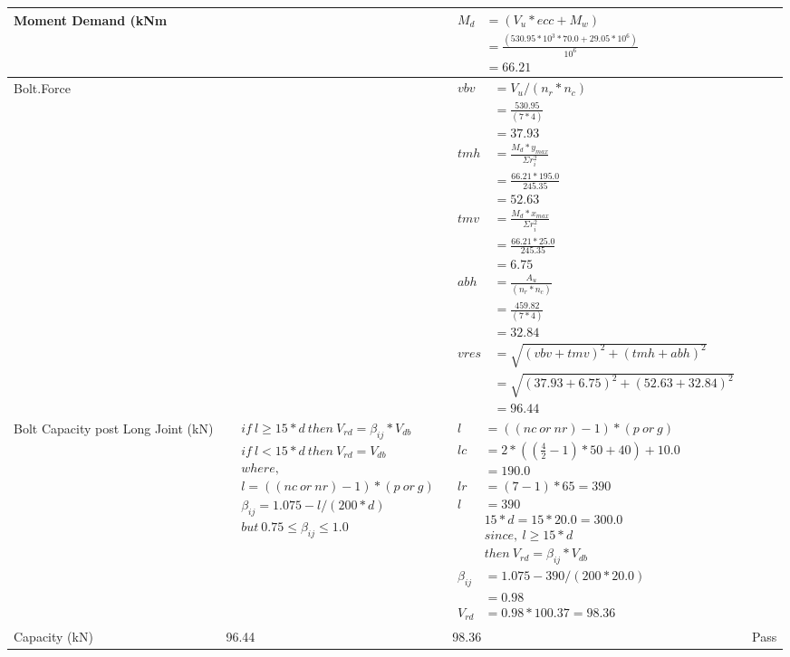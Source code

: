 \documentclass{article}%
\begin{document}
\begin{longtable}{|p{4cm}|p{5cm}|p{5.5cm}|p{1.5cm}|}
\hline%
Moment Demand (kNm&&$\begin{aligned}  M_d &= (V_u * ecc + M_w)\\  &= \frac{(530.95 * 10^3 *70.0 + 29.05*10^6)}{10^6}\\  & =66.21\end{aligned}$&\\%
\hline%
Bolt.Force&&$\begin{aligned} vbv~~ &= V_u / (n_r * n_c)\\  &= \frac{530.95}{ (7*4)}\\  & =37.93\\ tmh~ &= \frac{M_d * y_{max} }{ \Sigma r_i^2} \\  &= \frac{66.21 *195.0}{245.35}\\  & =52.63\\  tmv ~&= \frac{M_d * x_{max}}{\Sigma r_i^2}\\ &= \frac{66.21 * 25.0}{245.35}\\  & =6.75\\  abh~ & = \frac{A_u }{(n_r * n_c)}\\   & =\frac{459.82}{ (7 *4)}\\  & =32.84\\  vres &=\sqrt{(vbv +tmv) ^ 2 + (tmh+abh) ^ 2}\\   &= \sqrt{(37.93 +6.75) ^2 + (52.63+32.84) ^ 2}\\  & =96.44\end{aligned}$&\\%
\hline%
Bolt Capacity post Long Joint (kN)&$\begin{aligned} &if~l\geq 15 * d~then~V_{rd} = \beta_{ij} * V_{db} \\ & if~l < 15 * d~then~V_{rd} = V_{db} \\ & where,\\ & l = ((nc~or~nr) - 1) * (p~or~g) \\ & \beta_{ij} = 1.075 - l/(200 * d) \\ & but~0.75\leq\beta_{ij}\leq1.0 \end{aligned}$&$\begin{aligned} l&= ((nc~or~nr) - 1) * (p~or~g) \\  lc&= 2*((\frac{4}{2} - 1) * 50+40)+ 10.0\\&=190.0\\  lr&= (7 - 1) * 65=390\\  l&= 390\\ & 15 * d = 15 * 20.0 = 300.0 \\ &since,~l \geq 15 * d~ \\&then~V_{rd} = \beta_{ij} * V_{db} \\ \beta_{ij} &= 1.075 - 390/(200*20.0) \\&=0.98\\ V_{rd} &= 0.98 * 100.37=98.36 \end{aligned}$&\\%
\hline%
Capacity (kN)&96.44&98.36&Pass\\%
\hline%
\end{longtable}
\end{document}
